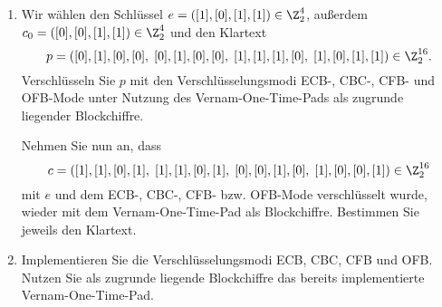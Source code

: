 \documentclass[german]{mhexsheet}
\newcommand{\mc}{\mathcal}
\begin{document}
\begin{exercise}[title = Verschlüsselungsmodi]
 \begin{enumerate}
  \item Wir wählen den Schlüssel $e = ([1], [0], [1], [1]) \in \Z_2^4$, außerdem $c_{0} = ([0], [0], [1], [1]) \in \Z_2^4$ und den Klartext
  \[p = ([0], [1], [0], [0], \; [0], [1], [0], [0], \; [1], [1], [1], [0],\; [1], [0], [1], [1]) \in \Z_2^{16}.\]
  Verschlüsseln Sie $p$ mit den Verschlüsselungsmodi ECB-, CBC-, CFB- und OFB-Mode unter Nutzung des Vernam-One-Time-Pads als zugrunde liegender Blockchiffre. 
 
  Nehmen Sie nun an, dass 
  \[c = ([1], [1], [0], [1], \; [1], [1], [0], [1], \; [0], [0], [1], [0],\; [1], [0], [0], [1]) \in \Z_2^{16}\]
  mit $e$ und dem ECB-, CBC-, CFB- bzw. OFB-Mode verschlüsselt wurde, wieder mit dem Vernam-One-Time-Pad als Blockchiffre. Bestimmen Sie jeweils den Klartext.  
  \item Implementieren Sie die Verschlüsselungsmodi ECB, CBC, CFB und OFB. Nutzen Sie als zugrunde liegende Blockchiffre das bereits implementierte Vernam-One-Time-Pad.
 \end{enumerate}
\end{exercise}
\end{document}

